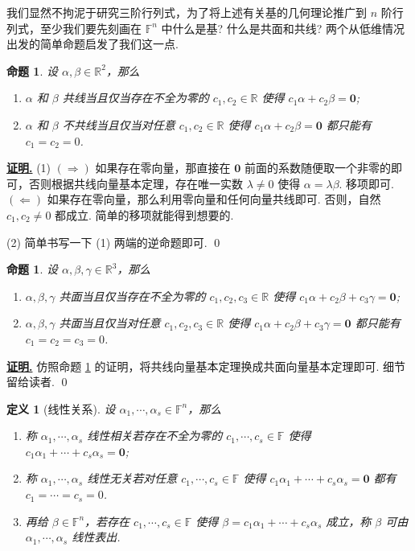 \documentclass[10pt,openany]{article}
\theoremstyle{thmstyle} %
\theoremstyle{defstyle} %
\newtheorem{definition}[theorem]{定义}
\theoremstyle{prostyle} %
\newtheorem{proposition}[theorem]{命题}
\theoremstyle{exastyle}
\theoremstyle{remstyle}
\renewenvironment{proof}[1][证明]{\par\underline{\textbf{#1.}} \;\fangsong}{\qed\par}
\newcommand{\F}{\mathbb{F}}
\newcommand{\R}{\mathbb{R}}
\begin{document}
我们显然不拘泥于研究三阶行列式，为了将上述有关基的几何理论推广到 \( n \) 阶行列式，至少我们要先刻画在 \( \F^n \) 中什么是基? 什么是共面和共线? 两个从低维情况出发的简单命题启发了我们这一点.

\begin{proposition} \label{2.3.5}
    设 \( \alpha, \beta \in \R^2 \)，那么
    \begin{enumerate}[(1)]
    	\item \( \alpha \) 和 \( \beta \) 共线当且仅当存在不全为零的 \( c_1,c_2 \in \R \) 使得 \( c_1\alpha+c_2\beta=\bm{0} \);
    	\item \( \alpha \) 和 \( \beta \) 不共线当且仅当对任意 \( c_1,c_2 \in \R \) 使得 \( c_1\alpha+c_2\beta=\bm{0} \) 都只能有 \( c_1=c_2=0 \).
    \end{enumerate}  
\end{proposition}

\begin{proof}
	(1) \( (\Rightarrow) \) 如果存在零向量，那直接在 \( \bm{0} \) 前面的系数随便取一个非零的即可，否则根据共线向量基本定理，存在唯一实数 \( \lambda \neq 0 \) 使得 \( \alpha=\lambda \beta \). 移项即可. \( (\Leftarrow) \) 如果存在零向量，那么利用零向量和任何向量共线即可. 否则，自然 \( c_1,c_2 \neq 0 \) 都成立. 简单的移项就能得到想要的.
	
	(2) 简单书写一下 (1) 两端的逆命题即可. 
\end{proof}

\begin{proposition}
	设 \( \alpha, \beta, \gamma \in \R^3 \)，那么
	\begin{enumerate}[(1)]
		\item \( \alpha , \beta, \gamma \) 共面当且仅当存在不全为零的 \( c_1,c_2,c_3 \in \R \) 使得 \( c_1\alpha+c_2\beta+c_3\gamma=\bm{0} \);
		\item \( \alpha , \beta, \gamma \) 共面当且仅当对任意 \( c_1,c_2,c_3 \in \R \) 使得 \( c_1\alpha+c_2\beta+c_3\gamma=\bm{0} \) 都只能有 \( c_1=c_2=c_3=0 \).
	\end{enumerate}  
\end{proposition}

\begin{proof}
	仿照命题 \ref{2.3.5} 的证明，将共线向量基本定理换成共面向量基本定理即可. 细节留给读者.
\end{proof}

\begin{definition}[线性关系]
	设 \( \alpha_1,\cdots,\alpha_s \in \F^n \)，那么
	\begin{enumerate}[(1)]
		\item 称 \( \alpha_1,\cdots,\alpha_s \) 线性相关若存在不全为零的 \( c_1,\cdots,c_s \in \F \) 使得 \( c_1\alpha_1+\cdots+c_s\alpha_s= \bm{0} \);
		\item 称 \( \alpha_1,\cdots,\alpha_s \) 线性无关若对任意 \( c_1,\cdots,c_s \in \F \) 使得 \( c_1\alpha_1+\cdots+c_s\alpha_s= \bm{0} \) 都有 \( c_1=\cdots=c_s=0 \).
		\item 再给 \( \beta \in \F^n \)，若存在 \( c_1,\cdots,c_s \in \F \) 使得 \( \beta= c_1\alpha_1+\cdots+c_s\alpha_s \) 成立，称 \( \beta \) 可由 \( \alpha_1,\cdots,\alpha_s \) 线性表出.
	\end{enumerate} 
\end{definition}
\end{document}
